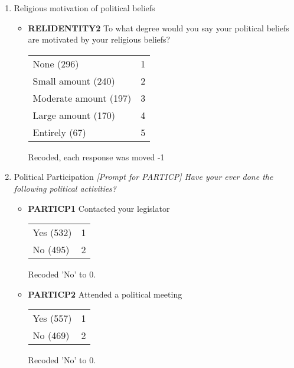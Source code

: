 \documentclass{article}
\begin{document}
\begin{enumerate}
\item Religious motivation of political beliefs

  	\begin{itemize}
		\item \textbf{RELIDENTITY2} To what degree would you say your political beliefs are motivated by your religious beliefs?
		\begin{table}[H]
		\centering
		\begin{tabular}{l l}
		None (296)				&	1 \\
		Small amount (240)		&	2 \\
		Moderate amount (197)	&	3 \\
		Large amount (170)		&	4 \\
		Entirely (67)			&	5 \\
		\end{tabular}
		\end{table}		
		Recoded, each response was moved -1
		\end{itemize}

\item Political Participation \textit{[Prompt for PARTICP] Have your ever done the following political activities?}

		\begin{itemize}
		\item \textbf{PARTICP1} Contacted your legislator
		\begin{table}[H]
		\centering
		\begin{tabular}{l l}
		Yes (532)	&	1 \\
		No (495)	&	2 \\
		\end{tabular}
		\end{table}
		Recoded 'No' to 0.
		\item \textbf{PARTICP2} Attended a political meeting
				\begin{table}[H]
				\centering
				\begin{tabular}{l l}
				Yes (557)	&	1 \\
				No (469)	&	2 \\
				\end{tabular}
				\end{table}
				Recoded 'No' to 0.
		

\end{itemize}
\end{enumerate}
\end{document}
